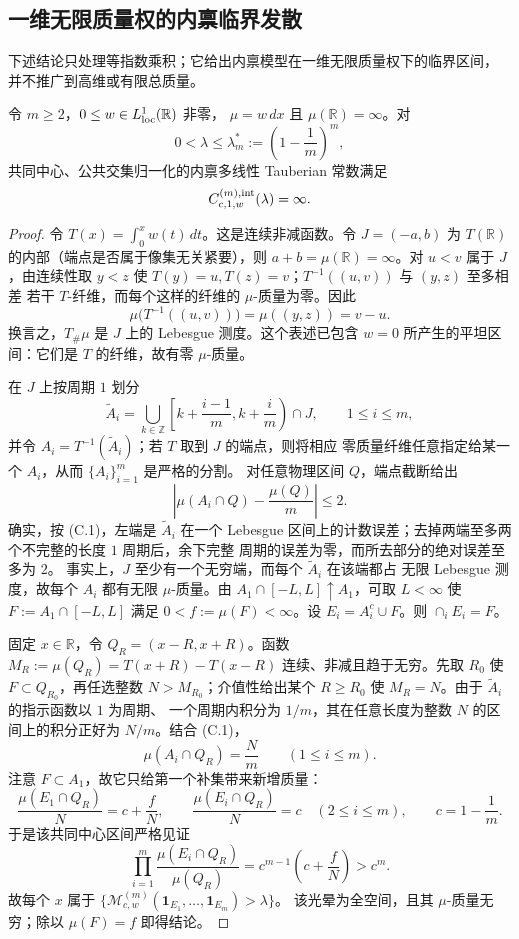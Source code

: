 \subsection{一维无限质量权的内禀临界发散}\label{subsec:one-dimensional-critical}

下述结论只处理等指数乘积；它给出内禀模型在一维无限质量权下的临界区间，
并不推广到高维或有限总质量。

\begin{theorem}\label{thm:one-dimensional-infinite-critical}
令 $m\ge2$，$0\le w\in L^1_{\rm loc}(\mathbb R)$ 非零，
$\mu=w\,dx$ 且 $\mu(\mathbb R)=\infty$。对
\[
0<\lambda\le\lambda_m^*:=\left(1-\frac1m\right)^m,
\]
共同中心、公共交集归一化的内禀多线性 Tauberian 常数满足
\[
C^{(m),\rm int}_{c,1,w}(\lambda)=\infty.
\]
\end{theorem}

\begin{proof}
令 $T(x)=\int_0^xw(t)\,dt$。这是连续非减函数。令
$J=(-a,b)$ 为 $T(\mathbb R)$ 的内部（端点是否属于像集无关紧要），则
$a+b=\mu(\mathbb R)=\infty$。对 $u<v$ 属于 $J$，由连续性取
$y<z$ 使 $T(y)=u,T(z)=v$；$T^{-1}((u,v))$ 与 $(y,z)$ 至多相差
若干 $T$-纤维，而每个这样的纤维的 $\mu$-质量为零。因此
\[
 \mu\bigl(T^{-1}((u,v))\bigr)=\mu((y,z))=v-u.
\tag{C.1}
\]
换言之，$T_\#\mu$ 是 $J$ 上的 Lebesgue 测度。这个表述已包含
$w=0$ 所产生的平坦区间：它们是 $T$ 的纤维，故有零 $\mu$-质量。

在 $J$ 上按周期 $1$ 划分
\[
\widetilde A_i=\bigcup_{k\in\mathbb Z}\left[k+\frac{i-1}{m},
k+\frac{i}{m}\right)\cap J,\qquad 1\le i\le m,
\]
并令 $A_i=T^{-1}(\widetilde A_i)$；若 $T$ 取到 $J$ 的端点，则将相应
零质量纤维任意指定给某一个 $A_i$，从而 $\{A_i\}_{i=1}^m$ 是严格的分割。
对任意物理区间 $Q$，端点截断给出
\[
\left|\mu(A_i\cap Q)-\frac{\mu(Q)}m\right|\le2.\tag{C.2}
\]
确实，按 \textup{(C.1)}，左端是 $\widetilde A_i$ 在一个 Lebesgue
区间上的计数误差；去掉两端至多两个不完整的长度 $1$ 周期后，余下完整
周期的误差为零，而所去部分的绝对误差至多为 $2$。
事实上，$J$ 至少有一个无穷端，而每个 $\widetilde A_i$ 在该端都占
无限 Lebesgue 测度，故每个 $A_i$ 都有无限 $\mu$-质量。由
$A_1\cap[-L,L]\uparrow A_1$，可取 $L<\infty$ 使
$F:=A_1\cap[-L,L]$ 满足 $0<f:=\mu(F)<\infty$。设
$E_i=A_i^c\cup F$。则
$\cap_iE_i=F$。

固定 $x\in\mathbb R$，令 $Q_R=(x-R,x+R)$。函数
$M_R:=\mu(Q_R)=T(x+R)-T(x-R)$ 连续、非减且趋于无穷。先取 $R_0$
使 $F\subset Q_{R_0}$，再任选整数 $N>M_{R_0}$；介值性给出某个
$R\ge R_0$ 使 $M_R=N$。由于 $\widetilde A_i$ 的指示函数以 $1$ 为周期、
一个周期内积分为 $1/m$，其在任意长度为整数 $N$ 的区间上的积分正好为
$N/m$。结合 \textup{(C.1)}，
\[
 \mu(A_i\cap Q_R)=\frac Nm\qquad(1\le i\le m).
\tag{C.3}
\]
注意 $F\subset A_1$，故它只给第一个补集带来新增质量：
\[
 \frac{\mu(E_1\cap Q_R)}N=c+\frac fN,
 \qquad
 \frac{\mu(E_i\cap Q_R)}N=c\quad(2\le i\le m),
 \qquad c=1-\frac1m.
\]
于是该共同中心区间严格见证
\[
 \prod_{i=1}^m\frac{\mu(E_i\cap Q_R)}{\mu(Q_R)}
=c^{m-1}\left(c+\frac fN\right)>c^m.
\tag{C.4}
\]
故每个 $x$ 属于
$\{\mathcal M^{(m)}_{c,w}(\mathbf1_{E_1},\ldots,\mathbf1_{E_m})>\lambda\}$。
该光晕为全空间，且其 $\mu$-质量无穷；除以 $\mu(F)=f$ 即得结论。
\end{proof}


